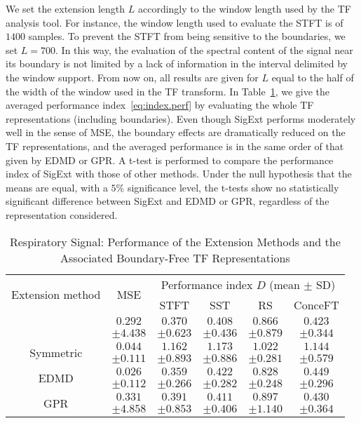 We set the extension length $L$ accordingly to the window length used by the TF analysis tool. For instance, the window length used to evaluate the STFT is of $1400$ samples. To prevent the STFT from being sensitive to the boundaries, we set $L=700$. In this way, the evaluation of the spectral content of the signal near its boundary is not limited by a lack of information in the interval delimited by the window support. From now on, all results are given for $L$ equal to the half of the width of the window used in the TF transform.
%
In Table~\ref{tab:THO}, we give the averaged performance index~\eqref{eq:index.perf} by evaluating the whole TF representations (including boundaries). Even though {\sf SigExt} performs moderately well in the sense of MSE, the boundary effects are dramatically reduced on the TF representations, and the averaged performance is in the same order of that given by EDMD or GPR. A t-test is performed to compare the performance index of {\sf SigExt} with those of other methods. Under the null hypothesis that the means are equal, with a $5\%$ significance level, the t-tests show no statistically significant difference between {\sf SigExt} and EDMD or GPR, regardless of the representation considered.


\begin{table}
\centering
\caption{Respiratory Signal: Performance of the Extension Methods and the Associated Boundary-Free TF Representations}
\begin{tabular}{|c||c||c|c|c|c|}
  \hline
   \multirow{2}{38pt}{\centering Extension method} & \multirow{2}{29pt}{\centering MSE} & \multicolumn{4}{c|}{Performance index $D$ (mean $\pm$ SD)} \\
   \cline{3-6}
      & & STFT & SST & RS & ConceFT \\
   \hhline{|=#=#=|=|=|=|}
   \multirow{2}{38pt}{\centering {\sf SigExt}} & $0.292$ & $0.370$ &  $0.408$ & $0.866$ & $0.423$ \\
   & $\pm 4.438$ & $\pm 0.623$ &  $\pm 0.436$ & $\pm 0.879$ & $\pm 0.344$ \\
   \hline
   \multirow{2}{38pt}{\centering Symmetric} & $0.044$ & $1.162$ & $1.173$ & $1.022$ & $1.144$ \\
   & $\pm 0.111$ & $\pm 0.893$ &  $\pm 0.886$ & $\pm 0.281$ & $\pm 0.579$ \\
   \hline
   \multirow{2}{38pt}{\centering EDMD} & $0.026$ & $0.359$ &  $0.422$ & $0.828$ & $0.449$ \\
   & $\pm 0.112$ & $\pm 0.266$ &  $\pm 0.282$ & $\pm 0.248$ & $\pm 0.296$ \\
   \hline
   \multirow{2}{38pt}{\centering GPR} & $0.331$ & $0.391$ &  $0.411$ & $0.897$ & $0.430$ \\ 
   & $\pm 4.858$ & $\pm 0.853$ &  $\pm 0.406$ & $\pm 1.140$ & $\pm 0.364$ \\
   \hline
\end{tabular}
\label{tab:THO}
\end{table}

